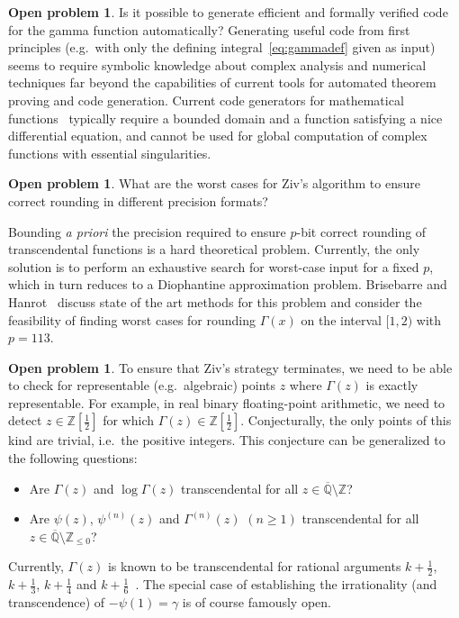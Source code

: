 \documentclass[reqno]{amsart}
\newcommand{\ZZ}{\mathbb{Z}}
\theoremstyle{definition}
\newtheorem{problem}[theorem]{Open problem}
\begin{document}
\begin{problem}
\label{problem:codegen}
Is it possible to generate efficient and formally verified
code for the gamma function automatically?
Generating useful code from first principles (e.g.\ with only the defining integral~\eqref{eq:gammadef} given as input)
seems to require symbolic knowledge about complex analysis and numerical techniques
far beyond the capabilities of current tools for automated theorem proving and code generation.
Current code generators for mathematical functions~\cite{kupriianova2014metalibm,lauter2015semi}
typically require a bounded domain and a function satisfying a nice differential equation,
and cannot be used for global computation of complex functions with essential singularities.
\end{problem}


\begin{problem}
What are the worst cases for Ziv's algorithm to ensure
correct rounding in different precision formats?

Bounding \emph{a priori} the precision required to ensure $p$-bit correct
rounding of transcendental functions is a hard theoretical problem.
Currently, the only solution is to perform an exhaustive
search for worst-case input for a fixed $p$,
which in turn reduces to a Diophantine approximation problem.
Brisebarre and Hanrot~\cite{brisebarre2021} discuss
state of the art methods for this problem
and consider the feasibility of finding worst cases for rounding $\Gamma(x)$ on the interval $[1, 2)$ with $p = 113$.
\end{problem}

\begin{problem}
To ensure that Ziv's strategy terminates, we need to be able
to check for representable (e.g.\ algebraic) points $z$ where $\Gamma(z)$ is exactly representable.
For example, in real binary floating-point arithmetic,
we need to detect $z  \in \ZZ[\tfrac{1}{2}]$ for which $\Gamma(z) \in \ZZ[\tfrac{1}{2}]$.
Conjecturally, the only points of this kind are trivial, i.e.\ the positive integers.
This conjecture can be generalized to the following questions:

\begin{itemize}
\item Are $\Gamma(z)$ and $\log \Gamma(z)$ transcendental for all $z \in \overline{\mathbb{Q}} \setminus \ZZ$?
\item Are $\psi(z)$, $\psi^{(n)}(z)$ and $\Gamma^{(n)}(z)$ $(n \ge 1)$ transcendental for all
$z \in \overline{\mathbb{Q}} \setminus \ZZ_{\le 0}$?
\end{itemize}

Currently, $\Gamma(z)$ is known to be transcendental for rational
arguments $k+\tfrac{1}{2}$, $k+\tfrac{1}{3}$, $k+\tfrac{1}{4}$ and $k+\tfrac{1}{6}$~\cite{waldschmidt2006transcendence}.
The special case of establishing the irrationality (and transcendence) of $-\psi(1) = \gamma$ is
of course famously open.
\end{problem}
\end{document}
